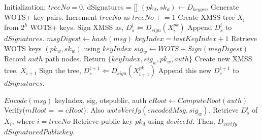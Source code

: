 \begin{algorithm}
    \caption{Proposed Hybrid Signature Approach}
    \label{alg:hybridsignature}
    \begin{algorithmic}[1]
            \State Initialization: $treeNo = 0$, dSignatures = []
            \Procedure{\textcolor{blue}{$\kgen$ D}}{}
                \State $(pk_d, sk_d) \leftarrow D_{keygen}$ 
            \EndProcedure
                {
                \State Generate WOTS+ key pairs.
                \EndProcedure
                }
              \EndFor
            \State Increment $treeNo$ as $treeNo  \mathrel{+}=1$
            \State Create XMSS tree $X_i$ from $2^h$ WOTS+ keys.
            \State Sign XMSS as, $D^i_{s} \Leftarrow D_{sign}(X_i^{pk})$
            \State Append $D^i_s$ to $dSignatures.$
            \EndProcedure
        \EndFor
    \EndProcedure
{}
    \State $msgDigest \leftarrow hash(msg)$
    \State $keyIndex = lastKeyIndex + 1$
    \State Retrieve WOTS keys $(pk_w, sk_w)$ using $keyIndex$
    \State $sig_w \leftarrow WOTS+Sign(msgDigest)$ 
    \State Record $auth$ path nodes.
    \State Return $\{keyIndex, sig_w, pk_w, auth\}$
    \EndProcedure
    \Else 
    \State Create new XMSS tree, $X_{i+1}$
    \State Sign the tree, $D^{i+1}_{s} \Leftarrow D_{sign}(X_{i+1}^{pk})$
    \State Append this new $D^{i+1}_{s}$ to  $dSignatures$.
    \EndIf
    
\EndProcedure
{}
    \State $Encode(msg)$
    \State {}keyIndex, sig, otspublic, auth
    \State $cRoot \leftarrow ComputeRoot(auth)$
    \State Verify($mRoot == cRoot$).
    \State Also $wotsVerify(encodedMsg, sig_w)$.
    \EndProcedure
    \State Retrieve $D_s^i$ of $X_i$, where $i = treeNo$
    \State Retrieve public key $pk_d$ using $deviceId$.
    \State Then, $D_{verify}$ $dSignature  dPublickey$.
    \EndProcedure
\EndProcedure
\end{algorithmic}
\end{algorithm}

